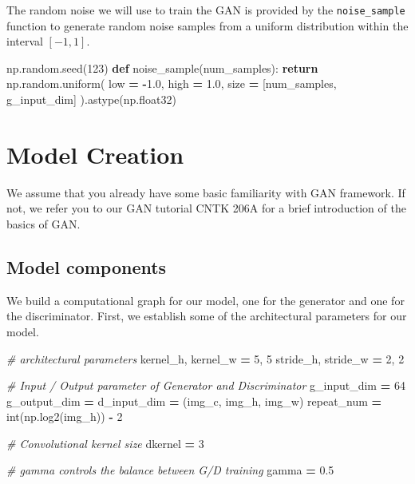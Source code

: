\documentclass[]{book}
\newenvironment{Shaded}{\begin{snugshade}}{\end{snugshade}}
\newcommand{\KeywordTok}[1]{\textcolor[rgb]{0.13,0.29,0.53}{\textbf{#1}}}
\newcommand{\DecValTok}[1]{\textcolor[rgb]{0.00,0.00,0.81}{#1}}
\newcommand{\FloatTok}[1]{\textcolor[rgb]{0.00,0.00,0.81}{#1}}
\newcommand{\CommentTok}[1]{\textcolor[rgb]{0.56,0.35,0.01}{\textit{#1}}}
\newcommand{\ControlFlowTok}[1]{\textcolor[rgb]{0.13,0.29,0.53}{\textbf{#1}}}
\newcommand{\OperatorTok}[1]{\textcolor[rgb]{0.81,0.36,0.00}{\textbf{#1}}}
\newcommand{\BuiltInTok}[1]{#1}
\newcommand{\NormalTok}[1]{#1}
\theoremstyle{definition}
\theoremstyle{definition}
\theoremstyle{definition}
\theoremstyle{remark}
\begin{document}
The random noise we will use to train the GAN is provided by the
\texttt{noise\_sample} function to generate random noise samples from a
uniform distribution within the interval \([-1, 1]\).

\begin{Shaded}
\begin{Highlighting}[]
\NormalTok{np.random.seed(}\DecValTok{123}\NormalTok{)}
\KeywordTok{def}\NormalTok{ noise_sample(num_samples):}
    \ControlFlowTok{return}\NormalTok{ np.random.uniform(}
\NormalTok{        low }\OperatorTok{=} \OperatorTok{-}\FloatTok{1.0}\NormalTok{,}
\NormalTok{        high }\OperatorTok{=} \FloatTok{1.0}\NormalTok{,}
\NormalTok{        size }\OperatorTok{=}\NormalTok{ [num_samples, g_input_dim]}
\NormalTok{    ).astype(np.float32)}
\end{Highlighting}
\end{Shaded}

\section{Model Creation}\label{model-creation}

We assume that you already have some basic familiarity with GAN
framework. If not, we refer you to our GAN tutorial CNTK 206A for a
brief introduction of the basics of GAN.

\subsection{Model components}\label{model-components}

We build a computational graph for our model, one for the generator and
one for the discriminator. First, we establish some of the architectural
parameters for our model.

\begin{Shaded}
\begin{Highlighting}[]
\CommentTok{# architectural parameters}
\NormalTok{kernel_h, kernel_w }\OperatorTok{=} \DecValTok{5}\NormalTok{, }\DecValTok{5} 
\NormalTok{stride_h, stride_w }\OperatorTok{=} \DecValTok{2}\NormalTok{, }\DecValTok{2}

\CommentTok{# Input / Output parameter of Generator and Discriminator}
\NormalTok{g_input_dim }\OperatorTok{=} \DecValTok{64}
\NormalTok{g_output_dim }\OperatorTok{=}\NormalTok{ d_input_dim }\OperatorTok{=}\NormalTok{ (img_c, img_h, img_w)}
\NormalTok{repeat_num }\OperatorTok{=} \BuiltInTok{int}\NormalTok{(np.log2(img_h)) }\OperatorTok{-} \DecValTok{2}

\CommentTok{# Convolutional kernel size}
\NormalTok{dkernel }\OperatorTok{=} \DecValTok{3}

\CommentTok{# gamma controls the balance between G/D training}
\NormalTok{gamma }\OperatorTok{=} \FloatTok{0.5}
\end{Highlighting}
\end{Shaded}
\end{document}
